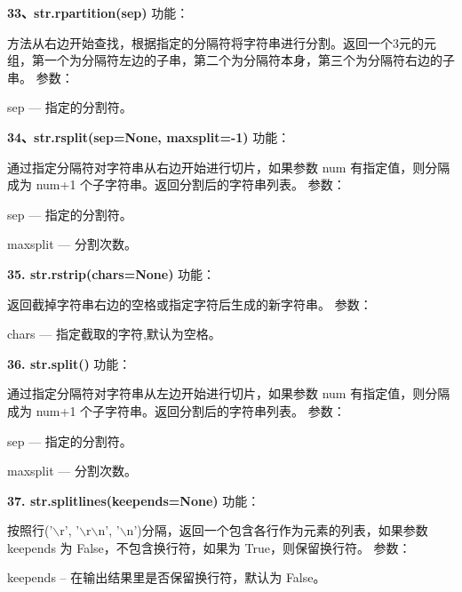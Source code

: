 \documentclass{book}
\begin{document}
\begin{CJK}{UTF8}{gbsn}
\noindent \textbf{33、str.rpartition(sep)} \newline
功能：\par 方法从右边开始查找，根据指定的分隔符将字符串进行分割。返回一个3元的元组，第一个为分隔符左边的子串，第二个为分隔符本身，第三个为分隔符右边的子串。\newline
参数：\par sep --- 指定的分割符。
\newline

\noindent \textbf{34、str.rsplit(sep=None, maxsplit=-1)} \newline
功能：\par 通过指定分隔符对字符串从右边开始进行切片，如果参数 num 有指定值，则分隔成为 num+1 个子字符串。返回分割后的字符串列表。\newline
参数：\par sep --- 指定的分割符。
     \par maxsplit --- 分割次数。
\newline

\noindent \textbf{35. str.rstrip(chars=None)} \newline
功能：\par 返回截掉字符串右边的空格或指定字符后生成的新字符串。\newline
参数：\par chars --- 指定截取的字符,默认为空格。
\newline

\noindent \textbf{36. str.split()} \newline
功能：\par 通过指定分隔符对字符串从左边开始进行切片，如果参数 num 有指定值，则分隔成为 num+1 个子字符串。返回分割后的字符串列表。\newline
参数：\par sep --- 指定的分割符。
     \par maxsplit --- 分割次数。
\newline

\noindent \textbf{37. str.splitlines(keepends=None)} \newline
功能：\par 按照行('$\backslash$r', '$\backslash$r$\backslash$n', '$\backslash$n')分隔，返回一个包含各行作为元素的列表，如果参数 keepends 为 False，不包含换行符，如果为 True，则保留换行符。\newline
参数：\par keepends -- 在输出结果里是否保留换行符，默认为 False。
\newline


\end{CJK}
\end{document}
